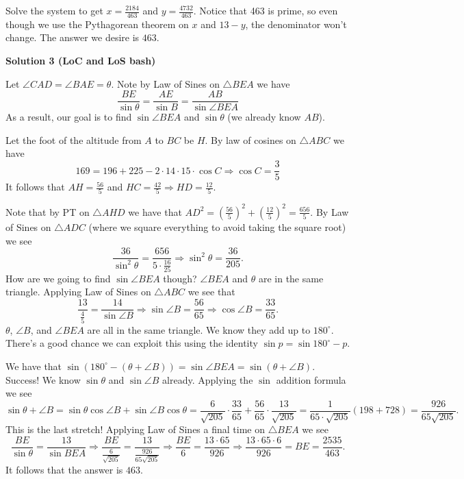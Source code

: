 \begin{enumerate}
 Solve the system to get $x = \frac{2184}{463}$ and $y = \frac{4732}{463}$.  Notice that 463 is prime, so even though we use the Pythagorean theorem on $x$ and $13-y$, the denominator won't change. The answer we desire is $\boxed{463}$.

 



\textbf{Solution 3 (LoC and LoS bash)}

Let $\angle CAD = \angle BAE = \theta$. Note by Law of Sines on $\triangle BEA$ we have
 \[\frac{BE}{\sin{\theta}} = \frac{AE}{\sin{B}} = \frac{AB}{\sin{\angle BEA}}\]As a result, our goal is to find $\sin{\angle BEA}$ and $\sin{\theta}$ (we already know $AB$). 

 Let the foot of the altitude from $A$ to $BC$ be $H$. By law of cosines on $\triangle ABC$ we have
 \[169 = 196 + 225 - 2 \cdot 14 \cdot 15 \cdot \cos{C} \Rightarrow \cos{C} = \frac{3}{5}\]It follows that $AH = \frac{56}{5}$ and $HC = \frac{42}{5} \Rightarrow HD = \frac{12}{5}$. 

 Note that by PT on $\triangle AHD$ we have that $AD^2 = \left(\frac{56}{5}\right)^2 + \left(\frac{12}{5}\right)^2 = \frac{656}{5}$. By Law of Sines on $\triangle ADC$ (where we square everything to avoid taking the square root) we see
 \[\frac{36}{\sin^2{\theta}} = \frac{656}{5 \cdot \frac{16}{25}} \Rightarrow \sin^2{\theta} = \frac{36}{205}.\]How are we going to find $\sin{\angle BEA}$ though? $\angle BEA$ and $\theta$ are in the same triangle. Applying Law of Sines on $\triangle ABC$ we see that
 \[\frac{13}{\frac{4}{5}} = \frac{14}{\sin{\angle B}} \Rightarrow \sin{\angle B} = \frac{56}{65} \Rightarrow \cos{\angle B} = \frac{33}{65}.\]$\theta$, $\angle B$, and $\angle BEA$ are all in the same triangle. We know they add up to $180^{\circ}$. There's a good chance we can exploit this using the identity $\sin{p} = \sin{180^{\circ}-p}$.

 We have that $\sin{(180^{\circ} - (\theta + \angle B))} = \sin{\angle BEA} = \sin{(\theta + \angle B)}$. Success! We know $\sin{\theta}$ and $\sin{\angle B}$ already. Applying the $\sin$ addition formula we see
 \[\sin{\theta + \angle B} = \sin{\theta} \cos{\angle B} + \sin{\angle B} \cos{\theta} = \frac{6}{\sqrt{205}} \cdot \frac{33}{65} + \frac{56}{65} \cdot \frac{13}{\sqrt{205}}=\frac{1}{65 \cdot \sqrt{205}} (198 + 728) = \frac{926}{65 \sqrt{205}}.\]This is the last stretch! Applying Law of Sines a final time on $\triangle BEA$ we see
 \[\frac{BE}{\sin{\theta}} = \frac{13}{\sin{BEA}} \Rightarrow \frac{BE}{\frac{6}{\sqrt{205}}} = \frac{13}{\frac{926}{65\sqrt{205}}} \Rightarrow \frac{BE}{6} = \frac{13 \cdot 65}{926} \Rightarrow \frac{13 \cdot 65 \cdot 6}{926} = BE = \frac{2535}{463}.\]It follows that the answer is $\boxed{463}$.


\end{enumerate}
